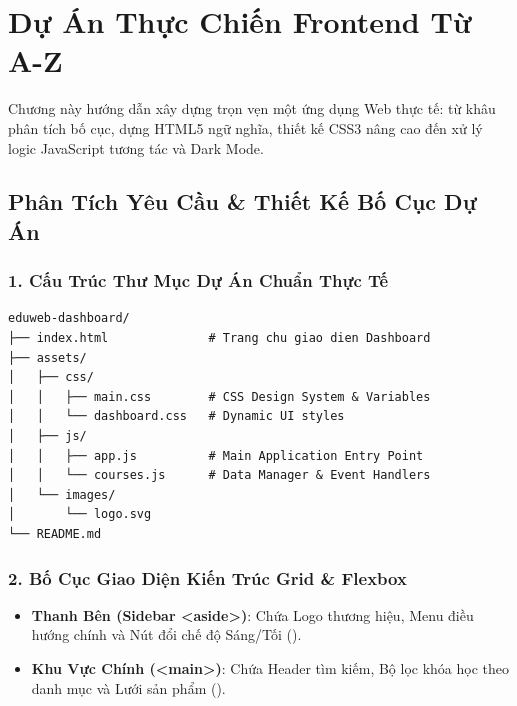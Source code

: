 \chapter{Dự Án Thực Chiến Frontend Từ A-Z}
\label{chap:full_frontend_project}

Chương này hướng dẫn xây dựng trọn vẹn một ứng dụng Web thực tế:  từ khâu phân tích bố cục, dựng HTML5 ngữ nghĩa, thiết kế CSS3 nâng cao đến xử lý logic JavaScript tương tác và Dark Mode.

\section{Phân Tích Yêu Cầu \& Thiết Kế Bố Cục Dự Án}

\subsection{1. Cấu Trúc Thư Mục Dự Án Chuẩn Thực Tế}

\begin{codeWindow}
\begin{lstlisting}[language=HTTP]
eduweb-dashboard/
├── index.html              # Trang chu giao dien Dashboard
├── assets/
│   ├── css/
│   │   ├── main.css        # CSS Design System & Variables
│   │   └── dashboard.css   # Dynamic UI styles
│   ├── js/
│   │   ├── app.js          # Main Application Entry Point
│   │   └── courses.js      # Data Manager & Event Handlers
│   └── images/
│       └── logo.svg
└── README.md
\end{lstlisting}
\end{codeWindow}

\subsection{2. Bố Cục Giao Diện Kiến Trúc Grid \& Flexbox}

\begin{conceptBox}
\begin{itemize}[leftmargin=1.5em, itemsep=3pt]
    \item \textbf{Thanh Bên (Sidebar <aside>)}: Chứa Logo thương hiệu, Menu điều hướng chính và Nút đổi chế độ Sáng/Tối ().
    \item \textbf{Khu Vực Chính (<main>)}: Chứa Header tìm kiếm, Bộ lọc khóa học theo danh mục và Lưới sản phẩm ().
\end{itemize}
\end{conceptBox}

